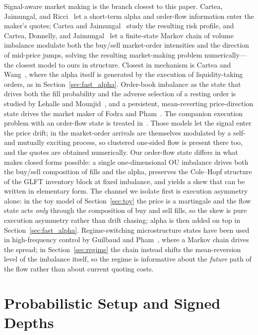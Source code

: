 \documentclass[11pt,a4paper]{article}
\theoremstyle{plain}
\theoremstyle{definition}
\begin{document}
Signal-aware market making is the branch closest to this paper.  Cartea,
Jaimungal, and Ricci~\cite{CarteaJaimungalRicci2014} let a short-term
alpha and order-flow information enter the maker's quotes; Cartea and
Jaimungal~\cite{CarteaJaimungal2015} study the resulting risk profile, and
Cartea, Donnelly, and Jaimungal~\cite{CarteaDonnellyJaimungal2018} let a
finite-state Markov chain of volume imbalance modulate both the buy/sell
market-order intensities and the direction of mid-price jumps, solving the
resulting market-making problem numerically---the closest model to ours in
structure.  Closest in mechanism is Cartea and
Wang~\cite{CarteaWang2020}, where the alpha itself is generated by the
execution of liquidity-taking orders, as in Section~\ref{sec:fast_alpha}.
Order-book imbalance as the state that drives both the fill probability and the
adverse selection of a resting order is studied by Lehalle and
Mounjid~\cite{LehalleMounjid2017}, and a persistent, mean-reverting
price-direction state drives the market maker of Fodra and
Pham~\cite{FodraPham2015}.  The companion execution
problem with an order-flow state is treated in~\cite{CarteaJaimungal2016}.
Those models let the signal enter the price drift; in
\cite{CarteaJaimungalRicci2014} the market-order arrivals are themselves
modulated by a self- and mutually exciting process, so clustered one-sided
flow is present there too, and the quotes are obtained numerically.  Our
order-flow state differs in what makes closed forms possible: a single
one-dimensional OU imbalance drives both the buy/sell composition of fills and
the alpha, preserves the Cole--Hopf structure of the GLFT inventory block at
fixed imbalance, and yields a skew that can be written in elementary form.
The channel we isolate first is execution asymmetry alone: in the toy model of
Section~\ref{sec:toy} the price is a martingale and the flow state acts
\emph{only} through the composition of buy and sell fills, so the skew is pure
execution asymmetry rather than drift chasing; alpha is then added on top in
Section~\ref{sec:fast_alpha}.  Regime-switching microstructure states have
been used in high-frequency control by Guilbaud and
Pham~\cite{GuilbaudPham2013}, where a Markov chain drives the spread; in
Section~\ref{sec:regime} the chain instead shifts the mean-reversion level of
the imbalance itself, so the regime is informative about the \emph{future}
path of the flow rather than about current quoting costs.

\section{Probabilistic Setup and Signed Depths}
\label{sec:setup}
\end{document}
